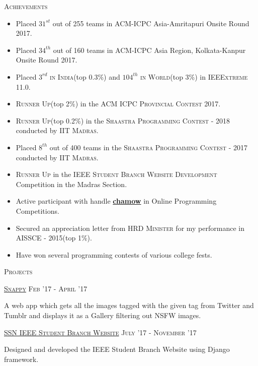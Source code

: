 \documentclass[11pt]{article}
\begin{document}
	{\centering\Large{\textsc{Achievements}} \hrulefill}
		
	\begin{itemize}
	\setlength\itemsep{-0.25em}
	\item Placed \textsc{$31^{st}$} out of 255 teams in \textsc{ACM-ICPC} Asia-Amritapuri Onsite Round 2017.
	\item Placed \textsc{$34^{th}$} out of 160 teams in \textsc{ACM-ICPC} Asia Region, Kolkata-Kanpur Onsite Round 2017.
	\item Placed \textsc{$3^{rd}$ in India}(top 0.3\%) and \textsc{$104^{th}$ in World}(top 3\%) in \textsc{IEEExtreme 11.0}.
	\item \textsc{Runner Up}(top 2\%) in the \textsc{ACM ICPC Provincial Contest 2017}.
	\item \textsc{Runner Up}(top 0.2\%) in the \textsc{Shaastra Programming Contest - 2018} conducted by \textsc{IIT Madras}.
	\item Placed \textsc{$8^{th}$} out of 400 teams in the \textsc{Shaastra Programming Contest - 2017} conducted by \textsc{IIT Madras}.
	\item \textsc{Runner Up} in the \textsc{IEEE Student Branch Website Development} Competition in the Madras Section.
	\item Active participant with handle \textbf{\href{https://www.stopstalk.com/user/profile/chamow}{chamow}} in Online Programming Competitions.	
	\item Secured an appreciation letter from \textsc{HRD Minister} for my performance in \textsc{AISSCE - 2015}(top 1\%).
	\item Have won several programming contests of various college fests.
	
	\end{itemize}
 	
	\vspace{2mm}

	{\centering\Large{\textsc{Projects}} \hrulefill}
		
	\vspace{2mm}
	\large{\textsc{\href{https://chamow97.github.io/snappy/}{Snappy}}}   \hfill \small\textsc{Feb '17 - April '17}
	\begin{itemize}
	\small
	{
	\item A web app which gets all the images tagged with the given tag from Twitter and Tumblr and displays it as a Gallery filtering out NSFW images.
	}
	\end{itemize}	
	\vspace{2mm}
	\large{\textsc{\href{http://ssnieee.herokuapp.com/}{SSN IEEE Student Branch Website}}}   \hfill \small\textsc{July '17 - November '17}
	\begin{itemize}
	\small
	{
	\item Designed and developed the IEEE Student Branch Website using Django framework. 
	}
	\end{itemize}	
	\vspace{3mm}
	
\end{document}
